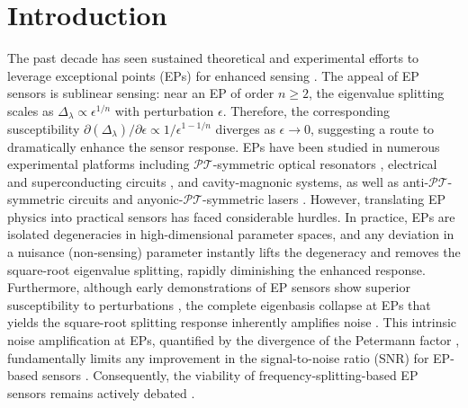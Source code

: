 \documentclass[%
  reprint,
  amsmath,amssymb,
  aps,
  prapplied,
  superscriptaddress,
  longbibliography]{revtex4-2}
\begin{document}
\date{\today}
\maketitle

\section{\label{sec:intro} Introduction}

The past decade has seen sustained theoretical and experimental efforts to leverage exceptional points (EPs) for enhanced sensing \cite{wiersig_review_2020, wiersig_sensors_2016, wiersig_enhancing_2014, park_symmetry-breaking-induced_2020, kononchuk_exceptional-point-based_2022, suntharalingam_noise_2023}. The appeal of EP sensors is sublinear sensing: near an EP of order $n \geq 2$, the eigenvalue splitting scales as $\Delta_\lambda \propto \epsilon^{1/n}$ with perturbation $\epsilon$. Therefore, the corresponding susceptibility $\partial(\Delta_\lambda)/\partial\epsilon \propto 1/{\epsilon^{1 - 1/n}}$ diverges as $\epsilon\to0$, suggesting a route to dramatically enhance the sensor response. EPs have been studied in numerous experimental platforms including $\mathcal{PT}$-symmetric optical resonators \cite{chen_parity-time-symmetric_2018, ozdemir_paritytime_2019, miri_exceptional_2019}, electrical and superconducting circuits \cite{kononchuk_exceptional-point-based_2022, lu_harnessing_2025, dong_sensitive_2019, huerta-morales_generating_2023, naghiloo_quantum_2019, chen_decoherence-induced_2022}, and cavity-magnonic \cite{zhang_observation_2017} systems, as well as anti-$\mathcal{PT}$-symmetric circuits \cite{choi_observation_2018} and anyonic-$\mathcal{PT}$-symmetric lasers \cite{arwas_anyonic-parity-time_2022}. However, translating EP physics into practical sensors has faced considerable hurdles. In practice, EPs are isolated degeneracies in high-dimensional parameter spaces, and any deviation in a nuisance (non-sensing) parameter instantly lifts the degeneracy and removes the square-root eigenvalue splitting, rapidly diminishing the enhanced response. Furthermore, although early demonstrations of EP sensors show superior susceptibility to perturbations \cite{chen_exceptional_2017}, the complete eigenbasis collapse at EPs that yields the square-root splitting response inherently amplifies noise \cite{wang_petermann-factor_2020}. This intrinsic noise amplification at EPs, quantified by the divergence of the Petermann factor \cite{siegman_excess_1989}, fundamentally limits any improvement in the signal-to-noise ratio (SNR) for EP-based sensors \cite{langbein_no_2018, loughlin_exceptional-point_2024}. Consequently, the viability of frequency-splitting-based EP sensors remains actively debated \cite{mortensen_fluctuations_2018, wang_petermann-factor_2020, wiersig_prospects_2020, grant_rotation_2021, zhang_quantum_2019, lau_fundamental_2018}.
\end{document}
